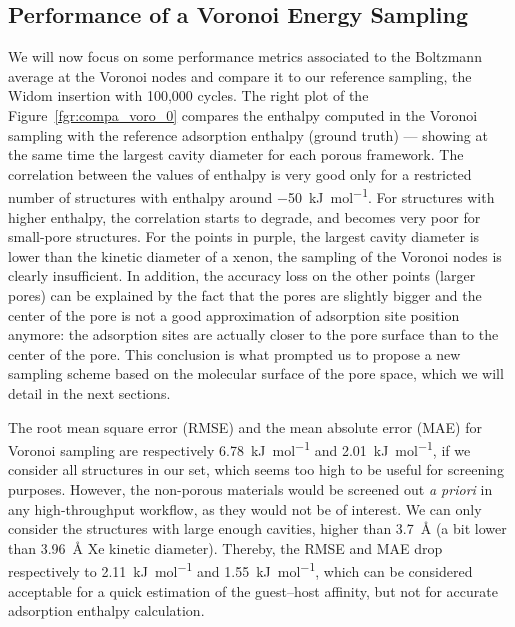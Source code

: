 \documentclass[main]{subfiles}
\begin{document}
\subsection{Performance of a Voronoi Energy Sampling}

We will now focus on some performance metrics associated to the Boltzmann average at the Voronoi nodes and compare it to our reference sampling, the Widom insertion with 100,000 cycles. The right plot of the Figure~\ref{fgr:compa_voro_0} compares the enthalpy computed in the Voronoi sampling with the reference adsorption enthalpy (ground truth) --- showing at the same time the largest cavity diameter for each porous framework. The correlation between the values of enthalpy is very good only for a restricted number of structures with enthalpy around \SI{-50}{\kilo\joule\per\mole}. For structures with higher enthalpy, the correlation starts to degrade, and becomes very poor for small-pore structures. For the points in purple, the largest cavity diameter is lower than the kinetic diameter of a xenon, the sampling of the Voronoi nodes is clearly insufficient. In addition, the accuracy loss on the other points (larger pores) can be explained by the fact that the pores are slightly bigger and the center of the pore is not a good approximation of adsorption site position anymore: the adsorption sites are actually closer to the pore surface than to the center of the pore. This conclusion is what prompted us to propose a new sampling scheme based on the molecular surface of the pore space, which we will detail in the next sections.

The root mean square error (RMSE) {and the mean absolute error (MAE) for Voronoi sampling are respectively \SI{6.78}{\kilo\joule\per\mole} and \SI{2.01}{\kilo\joule\per\mole}}, if we consider all structures in our set, which seems too high to be useful for screening purposes. However, the non-porous materials would be screened out \emph{a priori} in any high-throughput workflow, as they would not be of interest. We can only consider the structures with large enough cavities, higher than \SI{3.7}{\angstrom} (a bit lower than \SI{3.96}{\angstrom} Xe kinetic diameter). Thereby, {the RMSE and MAE drop respectively to \SI{2.11}{\kilo\joule\per\mole} and \SI{1.55}{\kilo\joule\per\mole}}, which can be considered acceptable for a quick estimation of the guest--host affinity, but not for accurate adsorption enthalpy calculation.
\end{document}
